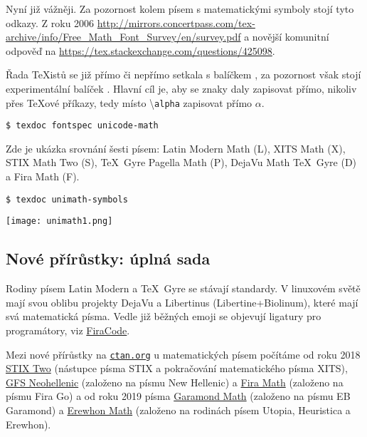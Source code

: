 Nyní již vážněji. Za pozornost kolem písem s matematickými symboly stojí tyto odkazy. Z roku 2006 \url{http://mirrors.concertpass.com/tex-archive/info/Free_Math_Font_Survey/en/survey.pdf} a novější komunitní odpověď na \url{https://tex.stackexchange.com/questions/425098}.

Řada \TeX istů se již přímo či nepřímo setkala s balíčkem \href{https://ctan.org/pkg/fontspec}{}, za pozornost však stojí experimentální balíček \href{https://ctan.org/pkg/unicode-math}{}. Hlavní cíl je, aby se znaky daly zapisovat přímo, nikoliv přes \TeX ové příkazy, tedy místo \textbackslash\texttt{alpha} zapisovat přímo $\alpha$.
\begin{lstlisting}
$ texdoc fontspec unicode-math
\end{lstlisting}

Zde je ukázka srovnání šesti písem: Latin Modern Math (L), XITS Math (X), STIX Math Two (S), \TeX\ Gyre Pagella Math (P), DejaVu Math \TeX\ Gyre (D) a Fira Math (F). 
\begin{lstlisting}
$ texdoc unimath-symbols
\end{lstlisting}

\noindent\hfil
\texttt{[image: unimath1.png]}



\subsection{Nové přírůstky: úplná sada}

Rodiny písem Latin Modern a \TeX\ Gyre se stávají standardy. V linuxovém světě mají svou oblibu projekty DejaVu a Libertinus (Libertine+Biolinum), které mají svá matematická písma. Vedle již běžných emoji se objevují ligatury pro programátory, viz 
\href{https://github.com/tonsky/FiraCode}{FiraCode}.

Mezi nové přírůstky na \href{https://ctan.org}{\tt ctan.org} u matematických písem počítáme 
od roku 2018 
\href{https://www.stixfonts.org/}{STIX Two} (nástupce písma STIX a pokračování matematického písma XITS), 
\href{https://ctan.org/tex-archive/fonts/gfsneohellenicmath}{GFS Neohellenic} (založeno na písmu New Hellenic) a
\href{https://ctan.org/pkg/firamath-otf}{Fira Math} (založeno na písmu Fira Go)
a od roku 2019 
písma 
\href{https://ctan.org/pkg/garamond-math}{Garamond Math} (založeno na písmu EB Garamond) a
\href{https://ctan.org/pkg/erewhon-math}{Erewhon Math} (založeno na rodinách písem Utopia, Heuristica a Erewhon).



